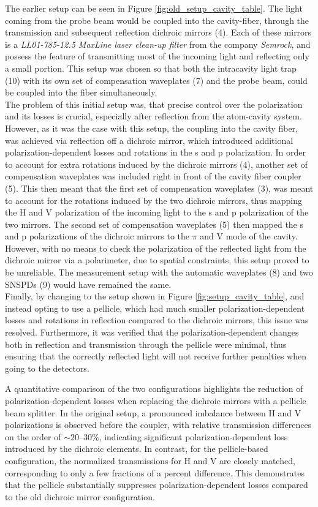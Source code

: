 The earlier setup can be seen in Figure \ref{fig:old_setup_cavity_table}. The light coming from the probe beam would be coupled into the cavity-fiber, through the transmission and subsequent reflection dichroic mirrors (4). Each of these mirrors is a \textit{LL01-785-12.5 MaxLine laser clean-up filter} from the company \textit{Semrock}, and possess the feature of transmitting most of the incoming light and reflecting only a small portion. This setup was chosen so that both the intracavity light trap (10) with its own set of compensation waveplates (7) and the probe beam, could be coupled into the fiber simultaneously.\\

The problem of this initial setup was, that precise control over the polarization and its losses is crucial, especially after reflection from the atom-cavity system. However, as it was the case with this setup, the coupling into the cavity fiber, was achieved via reflection off a dichroic mirror, which introduced additional polarization-dependent losses and rotations in the s and p polarization. In order to account for extra rotations induced by the dichroic mirrors (4), another set of compensation waveplates was included right in front of the cavity fiber coupler (5). This then meant that the first set of compensation waveplates (3), was meant to account for the rotations induced by the two dichroic mirrors, thus mapping the H and V polarization of the incoming light to the s and p polarization of the two mirrors. The second set of compensation waveplates (5) then mapped the s and p polarizations of the dichroic mirrors to the $\pi$ and V mode of the cavity. However, with no means to check the polarization of the reflected light from the dichroic mirror via a polarimeter, due to spatial constraints, this setup proved to be unreliable. The measurement setup with the automatic waveplates (8) and two SNSPDs (9) would have remained the same.\\

Finally, by changing to the setup shown in Figure \ref{fig:setup_cavity_table}, and instead opting to use a pellicle, which had much smaller polarization-dependent losses and rotations in reflection compared to the dichroic mirrors, this issue was resolved. Furthermore, it was verified that the polarization-dependent changes both in reflection and transmission through the pellicle were minimal, thus ensuring that the correctly reflected light will not receive further penalties when going to the detectors.

A quantitative comparison of the two configurations highlights the reduction of polarization-dependent losses when replacing the dichroic mirrors with a pellicle beam splitter. In the original setup, a pronounced imbalance between H and V polarizations is observed before the coupler, with relative transmission differences on the order of $\sim 20\text{--}30\%$, indicating significant polarization-dependent loss introduced by the dichroic elements. In contrast, for the pellicle-based configuration, the normalized transmissions for H and V are closely matched, corresponding to only a few fractions of a percent difference. This demonstrates that the pellicle substantially suppresses polarization-dependent losses compared to the old dichroic mirror configuration.
